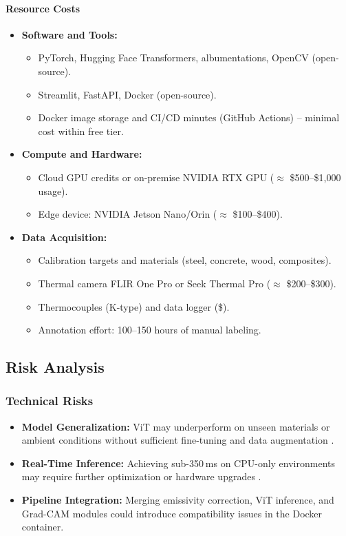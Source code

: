 \paragraph{Resource Costs}
\begin{itemize}[leftmargin=*]
    \item \textbf{Software and Tools:} 
    \begin{itemize}[leftmargin=*]
        \item PyTorch, Hugging Face Transformers, albumentations, OpenCV (open-source).
        \item Streamlit, FastAPI, Docker (open-source).
        \item Docker image storage and CI/CD minutes (GitHub Actions) – minimal cost within free tier.
    \end{itemize}
    \item \textbf{Compute and Hardware:}
    \begin{itemize}[leftmargin=*]
        \item Cloud GPU credits or on-premise NVIDIA RTX GPU (\(\approx\) \$500–\$1,000 usage).
        \item Edge device: NVIDIA Jetson Nano/Orin (\(\approx\) \$100–\$400).
    \end{itemize}
    \item \textbf{Data Acquisition:}
    \begin{itemize}[leftmargin=*]
        \item Calibration targets and materials (steel, concrete, wood, composites).
        \item Thermal camera FLIR One Pro or Seek Thermal Pro (\(\approx\) \$200–\$300).
        \item Thermocouples (K-type) and data logger (\$\approx{}).
        \item Annotation effort: 100–150 hours of manual labeling.
    \end{itemize}
\end{itemize}

\subsection{Risk Analysis}

\subsubsection{Technical Risks}
\begin{itemize}[leftmargin=*]
    \item \textbf{Model Generalization:} ViT may underperform on unseen materials or ambient conditions without sufficient fine-tuning and data augmentation \cite{Dosovitskiy2021,Liu2024}.
    \item \textbf{Real-Time Inference:} Achieving sub-350 ms on CPU-only environments may require further optimization or hardware upgrades \cite{Staecker2021}.
    \item \textbf{Pipeline Integration:} Merging emissivity correction, ViT inference, and Grad-CAM modules could introduce compatibility issues in the Docker container.
\end{itemize}

